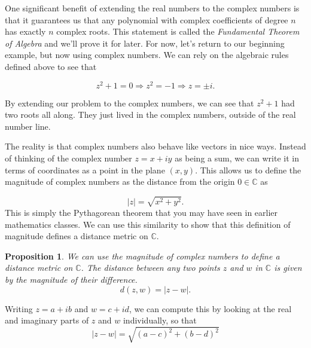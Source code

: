 \documentclass[12pt]{article}
\newcommand{\bbN}{\mathbb{N}}
\newcommand{\bbC}{\mathbb{C}}
\newcommand{\abs}[1]{ \left| #1 \right| }
\newtheorem{prop}[thm]{Proposition}
\theoremstyle{definition}
\theoremstyle{remark}
\numberwithin{equation}{section}
\begin{document}
One significant benefit of extending the real numbers to the complex numbers is that it guarantees us that any polynomial with complex coefficients of degree $n$ has exactly $n$ complex roots. This statement is called the \emph{Fundamental Theorem of Algebra} and we'll prove it for later. For now, let's return to our beginning example, but now using complex numbers. We can rely on the algebraic rules defined above to see that

\begin{equation}
  z^2 + 1 = 0 \Rightarrow z^2 = -1 \Rightarrow z = \pm i.
\end{equation}

By extending our problem to the complex numbers, we can see that $z^2 + 1$ had two roots all along. They just lived in the complex numbers, outside of the real number line.



The reality is that complex numbers also behave like vectors in nice ways. Instead of thinking of the complex number $z = x + iy$ as being a sum, we can write it in terms of coordinates as a point in the plane $(x,y)$. This allows us to define the magnitude of complex numbers as the distance from the origin $0 \in \bbC$ as

\begin{equation}
\abs{z} = \sqrt{x^2 + y^2}.
\end{equation}
This is simply the Pythagorean theorem that you may have seen in earlier mathematics classes. We can use this similarity to show that this definition of magnitude defines a distance metric on $\bbC$.

\begin{prop}
  We can use the magnitude of complex numbers to define a distance metric on $\bbC$. The distance between any two points $z$ and $w$ in $\bbC$ is given by the magnitude of their difference.
  \begin{equation}
    d(z,w) = \abs{z - w}. 
  \end{equation}

\end{prop}
Writing $z = a + ib$ and $w = c + id$, we can compute this by looking at the real and imaginary parts of $z$ and $w$ individually, so that
\begin{equation}
  \abs{z - w} = \sqrt{(a-c)^2 + (b-d)^2}
\end{equation}
\end{document}
